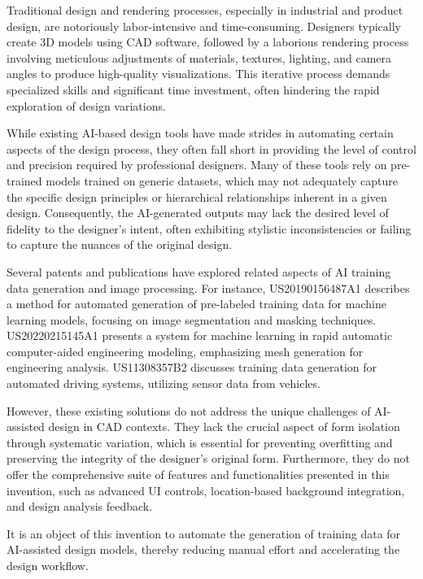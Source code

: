 \patentParagraph
Traditional design and rendering processes, especially in industrial and product design, are notoriously labor-intensive and time-consuming. Designers typically create 3D models using CAD software, followed by a laborious rendering process involving meticulous adjustments of materials, textures, lighting, and camera angles to produce high-quality visualizations. This iterative process demands specialized skills and significant time investment, often hindering the rapid exploration of design variations.

\patentParagraph
While existing AI-based design tools have made strides in automating certain aspects of the design process, they often fall short in providing the level of control and precision required by professional designers. Many of these tools rely on pre-trained models trained on generic datasets, which may not adequately capture the specific design principles or hierarchical relationships inherent in a given design. Consequently, the AI-generated outputs may lack the desired level of fidelity to the designer's intent, often exhibiting stylistic inconsistencies or failing to capture the nuances of the original design.

\patentParagraph
Several patents and publications have explored related aspects of AI training data generation and image processing. For instance, US20190156487A1 describes a method for automated generation of pre-labeled training data for machine learning models, focusing on image segmentation and masking techniques. US20220215145A1 presents a system for machine learning in rapid automatic computer-aided engineering modeling, emphasizing mesh generation for engineering analysis. US11308357B2 discusses training data generation for automated driving systems, utilizing sensor data from vehicles.

\patentParagraph
However, these existing solutions do not address the unique challenges of AI-assisted design in CAD contexts. They lack the crucial aspect of form isolation through systematic variation, which is essential for preventing overfitting and preserving the integrity of the designer's original form. Furthermore, they do not offer the comprehensive suite of features and functionalities presented in this invention, such as advanced UI controls, location-based background integration, and design analysis feedback.


\patentParagraph
It is an object of this invention to automate the generation of training data for AI-assisted design models, thereby reducing manual effort and accelerating the design workflow.

